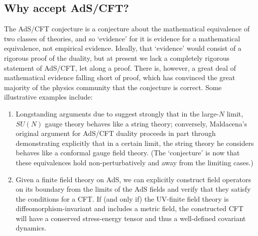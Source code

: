 \documentclass{article}
\begin{document}
\subsection{Why accept AdS/CFT?}

The AdS/CFT conjecture is a conjecture about the mathematical equivalence of two classes of theories, and so `evidence' for it is evidence for a mathematical equivalence, not empirical evidence. Ideally, that `evidence' would consist of a rigorous proof of the duality, but at present we lack a completely rigorous statement of AdS/CFT, let along a proof. There is, however, a great deal of mathematical evidence falling short of proof, which has convinced the great majority of the physics community that the conjecture is correct.  Some illustrative examples include:
\begin{enumerate}
\item Longstanding arguments due to  suggest strongly that in the large-$N$ limit, $SU(N)$ gauge theory behaves like a string theory; conversely, Maldacena's original argument for AdS/CFT duality proceeds in part through demonstrating explicitly that in a certain limit, the string theory he considers behaves like a conformal gauge field theory. (The `conjecture' is now that these equivalences hold non-perturbatively and away from the limiting cases.)
\item Given a finite field theory on AdS, we can explicitly construct field operators on its boundary from the limits of the AdS fields and verify that they satisfy the conditions for a CFT. If (and only if) the UV-finite field theory is diffeomorphism-invariant and includes a metric field, the constructed CFT will have a conserved stress-energy tensor and thus a well-defined covariant dynamics. 


\end{enumerate}
\end{document}
